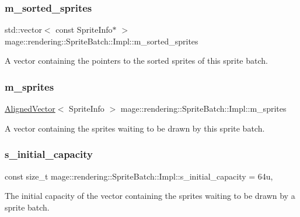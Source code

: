 \subsubsection{\texorpdfstring{m\+\_\+sorted\+\_\+sprites}{m\_sorted\_sprites}}
{\footnotesize\ttfamily std\+::vector$<$ const Sprite\+Info$\ast$ $>$ mage\+::rendering\+::\+Sprite\+Batch\+::\+Impl\+::m\+\_\+sorted\+\_\+sprites\hspace{0.3cm}{\ttfamily [private]}}

A vector containing the pointers to the sorted sprites of this sprite batch. \mbox{\label{classmage_1_1rendering_1_1_sprite_batch_1_1_impl_ad8f211053433418cf5fa6c64402936b3}} 
\subsubsection{\texorpdfstring{m\+\_\+sprites}{m\_sprites}}
{\footnotesize\ttfamily \mbox{\hyperlink{namespacemage_a8664bfb5ce2179fc64eae9f82c8a5ba8}{Aligned\+Vector}}$<$ Sprite\+Info $>$ mage\+::rendering\+::\+Sprite\+Batch\+::\+Impl\+::m\+\_\+sprites\hspace{0.3cm}{\ttfamily [private]}}

A vector containing the sprites waiting to be drawn by this sprite batch. \mbox{\label{classmage_1_1rendering_1_1_sprite_batch_1_1_impl_a08c5c67bb9af1c630745aba436718ff5}} 
\subsubsection{\texorpdfstring{s\+\_\+initial\+\_\+capacity}{s\_initial\_capacity}}
{\footnotesize\ttfamily const size\+\_\+t mage\+::rendering\+::\+Sprite\+Batch\+::\+Impl\+::s\+\_\+initial\+\_\+capacity = 64u\hspace{0.3cm}{\ttfamily [static]}, {\ttfamily [private]}}

The initial capacity of the vector containing the sprites waiting to be drawn by a sprite batch. 